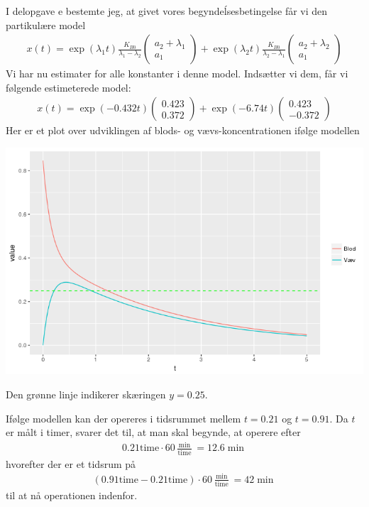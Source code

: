 \documentclass[12pt]{article}
\begin{document}
I delopgave e bestemte jeg, at givet vores begyndeĺsesbetingelse får vi den partikulære model
\begin{align}
x(t) = \exp(\lambda_1 t)\frac{K_{B0}}{\lambda_1 - \lambda_2}\begin{pmatrix}
a_2 + \lambda_1\\
a_1
\end{pmatrix}  + \exp(\lambda_2t)\frac{K_{B0}}{\lambda_2 - \lambda_1}\begin{pmatrix}
a_2 + \lambda_2\\
a_1
\end{pmatrix}
\end{align}
Vi har nu estimater for alle konstanter i denne model. Indsætter vi dem, får vi følgende estimeterede model:
\begin{align}
x(t) = \exp(-0.432 t)\begin{pmatrix}
0.423\\
0.372
\end{pmatrix}  + \exp(-6.74t)\begin{pmatrix}
0.423\\
-0.372
\end{pmatrix}
\end{align}
Her er et plot over udviklingen af blods- og vævs-koncentrationen ifølge modellen
\begin{center}
\includegraphics[scale=0.5]{q1p2.png}
\end{center}
Den grønne linje indikerer skæringen $y=0.25$. 

Ifølge modellen kan der opereres i tidsrummet mellem $t=0.21$ og $t=0.91$. Da $t$ er målt i timer, svarer det til, at man skal begynde, at operere efter
\begin{align}
0.21\text{time}\cdot 60 \frac{\min}{\text{time}} = 12.6\min
\end{align}
hvorefter der er et tidsrum på
\begin{align}
(0.91 \text{time} - 0.21\text{time})\cdot 60 \frac{\min}{\text{time}} = 42\min
\end{align}
til at nå operationen indenfor.
\end{document}
